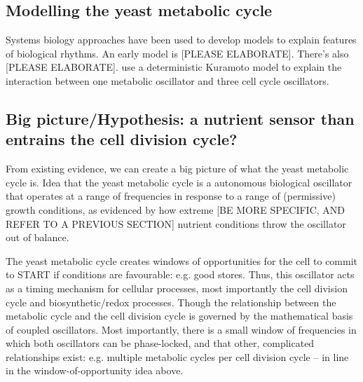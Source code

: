\subsection{Modelling the yeast metabolic cycle}
\label{subsec:intro-ymc-model}

Systems biology approaches have been used to develop models to explain features of biological rhythms.
An early model is \parencite{jonesCyberneticModelGrowth1999} [PLEASE ELABORATE].
There's also \textcite{krishnaMinimalPushPull2018} [PLEASE ELABORATE].
\citet{ozsezenInferenceHighLevelInteraction2019} use a deterministic Kuramoto model to explain the interaction between one metabolic oscillator and three cell cycle oscillators.

\subsection{Big picture/Hypothesis: a nutrient sensor than entrains the cell division cycle?}
\label{subsec:intro-ymc-hypothesis}

From existing evidence, we can create a big picture of what the yeast metabolic cycle is.
Idea that the yeast metabolic cycle is a autonomous biological oscillator that operates at a range of frequencies in response to a range of (permissive) growth conditions, as evidenced by how extreme [BE MORE SPECIFIC, AND REFER TO A PREVIOUS SECTION] nutrient conditions throw the oscillator out of balance.

The yeast metabolic cycle creates windows of opportunities for the cell to commit to START if conditions are favourable: e.g. good stores.
Thus, this oscillator acts as a timing mechanism for cellular processes, most importantly the cell division cycle and biosynthetic/redox processes.
Though the relationship between the metabolic cycle and the cell division cycle is governed by the mathematical basis of coupled oscillators.
Most importantly, there is a small window of frequencies in which both oscillators can be phase-locked, and that other, complicated relationships exist: e.g. multiple metabolic cycles per cell division cycle -- in line in the window-of-opportunity idea above.

